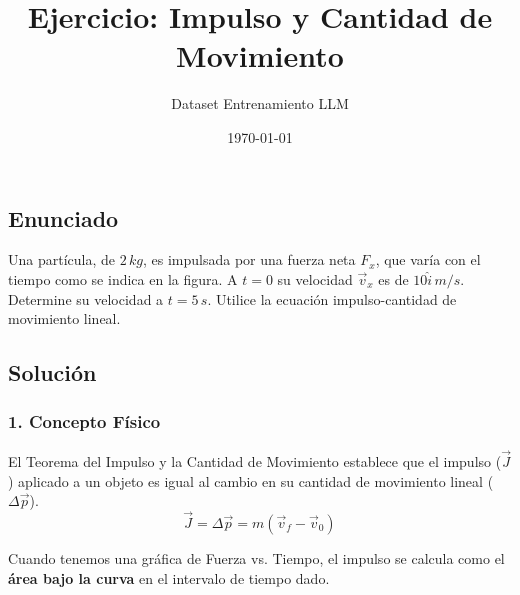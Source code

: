 \documentclass[12pt, a4paper]{article}
\title{Ejercicio: Impulso y Cantidad de Movimiento}
\author{Dataset Entrenamiento LLM}
\date{\today}
\begin{document}
\newpage

\maketitle

\subsection*{Enunciado}
Una partícula, de $2 \, \si{kg}$, es impulsada por una fuerza neta $F_x$, que varía con el tiempo como se indica en la figura. A $t = 0$ su velocidad $\vec{v}_x$ es de $10 \hat{i} \, \si{m/s}$. Determine su velocidad a $t = 5 \, \si{s}$. Utilice la ecuación impulso-cantidad de movimiento lineal.

\begin{center}
\end{center}

\subsection*{Solución}

\subsubsection*{1. Concepto Físico}
El Teorema del Impulso y la Cantidad de Movimiento establece que el impulso ($\vec{J}$) aplicado a un objeto es igual al cambio en su cantidad de movimiento lineal ($\Delta \vec{p}$).
$$ \vec{J} = \Delta \vec{p} = m(\vec{v}_f - \vec{v}_0) $$

Cuando tenemos una gráfica de Fuerza vs. Tiempo, el impulso se calcula como el \textbf{área bajo la curva} en el intervalo de tiempo dado.
\end{document}
